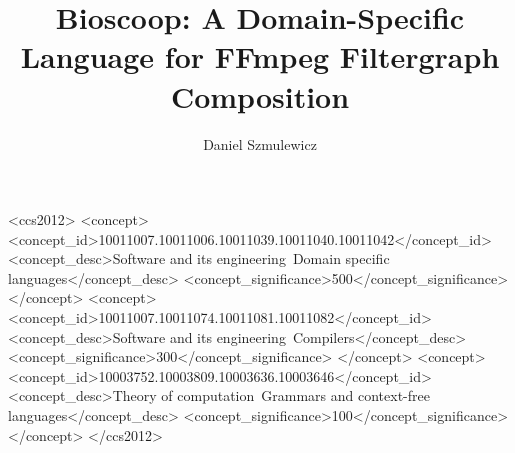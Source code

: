 \documentclass[english,submission]{programming}
\begin{document}
\title{Bioscoop: A Domain-Specific Language for FFmpeg Filtergraph Composition}

\author{Daniel Szmulewicz}


\begin{CCSXML}
<ccs2012>
<concept>
<concept_id>10011007.10011006.10011039.10011040.10011042</concept_id>
<concept_desc>Software and its engineering~Domain specific languages</concept_desc>
<concept_significance>500</concept_significance>
</concept>
<concept>
<concept_id>10011007.10011074.10011081.10011082</concept_id>
<concept_desc>Software and its engineering~Compilers</concept_desc>
<concept_significance>300</concept_significance>
</concept>
<concept>
<concept_id>10003752.10003809.10003636.10003646</concept_id>
<concept_desc>Theory of computation~Grammars and context-free languages</concept_desc>
<concept_significance>100</concept_significance>
</concept>
</ccs2012>
\end{CCSXML}


\maketitle
\end{document}

